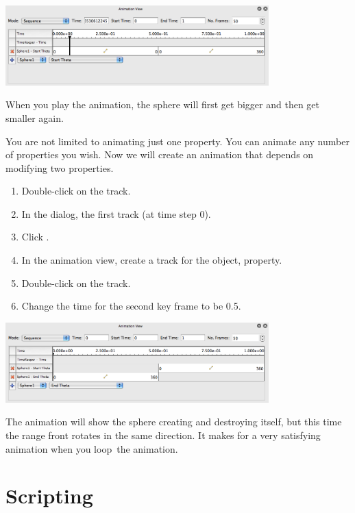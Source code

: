 \begin{inlinefig}
  \includegraphics[width=4in]{images/BuildAnimation2}
\end{inlinefig}

When you play the animation, the sphere will first get bigger and then get
smaller again.

You are not limited to animating just one property.  You can animate any
number of properties you wish.  Now we will create an animation that
depends on modifying two properties.

\begin{enumerate}
\item Double-click on the  track.
\item In the  dialog,  the first track
  (at time step 0).
\item Click .
\item In the animation view, create a track for the  object,
   property.
\item Double-click on the  track.
\item Change the time for the second key frame to be 0.5.
\end{enumerate}

\begin{inlinefig}
  \includegraphics[width=4in]{images/BuildAnimation3}
\end{inlinefig}

The animation will show the sphere creating and destroying itself, but this
time the range front rotates in the same direction.  It makes for a very
satisfying animation when you loop~\vcrLoop the animation.


\section{Scripting}

